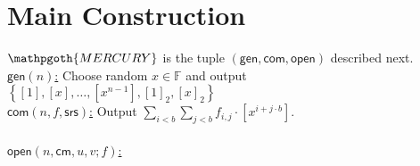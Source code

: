 \documentclass[11pt]{article} %
\newcommand{\mercury}{\ensuremath{\mathpgoth{MERCURY} }\xspace}
\newcommand{\F}{\ensuremath{\mathbb F}\xspace}
\newcommand{\srs}{\ensuremath{\mathsf{srs}}\xspace}
\newcommand{\com}{\ensuremath{\mathsf{com}}\xspace}
\newcommand{\cm}{\ensuremath{\mathsf{cm}}\xspace}
\newcommand{\open}{\ensuremath{\mathsf{open}}\xspace}
\newcommand{\enc}[1]{\ensuremath{\left[#1\right]}\xspace}
\newcommand{\enctwo}[1]{\ensuremath{\left[#1\right]_2}\xspace}
\newcommand{\gen}{\ensuremath{\mathsf{gen}}\xspace}
\newcommand{\set}[1]{\ensuremath{\left\{#1\right\}}\xspace}
\newcommand{\sumi}[1]{\sum_{i< #1}}
\newcommand{\sumj}[1]{\sum_{j< #1}}
\begin{document}
\section{Main Construction}\label{sec:main}
\mercury is the tuple $(\gen,\com,\open)$ described next. \\    

\noindent
\underline{$\gen(n)$:}
Choose random $x\in \F$ and output \set{\enc{1},\enc{x},\ldots,\enc{x^{n-1}},\enctwo{1},\enctwo{x}}\\

\noindent
\underline{$\com(n,f,\srs)$:}
 Output $\sumi{b}\sumj{b}f_{i,j}\cdot \enc{x^{i + j\cdot b}}$.\\ \\ 

\noindent
\underline{$\open(n,\cm,u,v;f)$:} \\ \noindent
\end{document}
